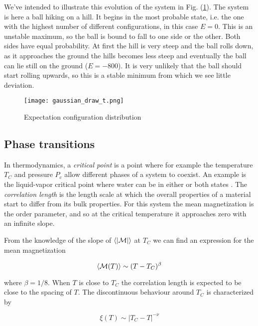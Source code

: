 \documentclass[11pt]{article}
\begin{document}
\begin{flushleft}
We've intended to illustrate this evolution of the system in Fig. (\ref{fig::illustration}). The system is here a ball hiking on a hill. It begins in the most probable state, i.e. the one with the highest number of different configurations, in this case $E=0$. This is an unstable maximum, so the ball is bound to fall to one side or the other. Both sides have equal probability. At first the hill is very steep and the ball rolls down, as it approaches the ground the hills becomes less steep and eventually the ball can lie still on the ground ($E=-800$). It is very unlikely that the ball should start rolling upwards, so this is a stable minimum from which we see little deviation. 

\begin{figure}[H]
\centering
\texttt{[image: gaussian\_draw\_t.png]}
\caption{Expectation configuration distribution}
\label{fig::illustration}
\end{figure}

\end{flushleft}



\subsection{Phase transitions}

\begin{flushleft}
In thermodynamics, a \textit{critical point} is a point where for example the temperature $T_C$ and pressure $P_c$ allow different phases of a system to coexist. An example is the liquid-vapor critical point where water can be in either or both states \cite{schroeder2000introduction}. The \textit{correlation length} is the length scale at which the overall properties of a material start to differ from its bulk properties. For this system the mean magnetization is the order parameter, and so at the critical temperature it approaches zero with an infinite slope.
\end{flushleft}

\begin{flushleft}
From the knowledge of the slope of $\braket{|\mathcal{M}|}$ at $T_C$ we can find an expression for the mean magnetization

\begin{equation}
\braket{\mathcal{M}(T)} \sim (T-T_C)^{\beta}
\end{equation}

where $\beta=1/8$. When $T$ is close to $T_C$ the correlation length is expected to be close to the spacing of $T$. The discontinuous behaviour around $T_C$ is characterized by

\begin{equation}
\xi(T) \sim |T_C -T|^{- \nu}
\end{equation}
\end{flushleft}
\end{document}

